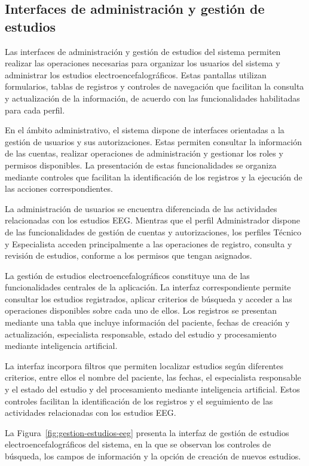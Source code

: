 \subsection{Interfaces de administración y gestión de estudios}

Las interfaces de administración y gestión de estudios del sistema
permiten realizar las operaciones necesarias para organizar los
usuarios del sistema y administrar los estudios
electroencefalográficos. Estas pantallas utilizan formularios,
tablas de registros y controles de navegación que facilitan la
consulta y actualización de la información, de acuerdo con las
funcionalidades habilitadas para cada perfil.

En el ámbito administrativo, el sistema dispone de interfaces
orientadas a la gestión de usuarios y sus autorizaciones. Estas
permiten consultar la información de las cuentas, realizar
operaciones de administración y gestionar los roles y permisos
disponibles. La presentación de estas funcionalidades se organiza
mediante controles que facilitan la identificación de los registros
y la ejecución de las acciones correspondientes.

La administración de usuarios se encuentra diferenciada de las
actividades relacionadas con los estudios EEG. Mientras que el
perfil Administrador dispone de las funcionalidades de gestión de
cuentas y autorizaciones, los perfiles Técnico y Especialista
acceden principalmente a las operaciones de registro, consulta
y revisión de estudios, conforme a los permisos que tengan
asignados.

La gestión de estudios electroencefalográficos constituye una de
las funcionalidades centrales de la aplicación. La interfaz
correspondiente permite consultar los estudios registrados,
aplicar criterios de búsqueda y acceder a las operaciones
disponibles sobre cada uno de ellos. Los registros se presentan
mediante una tabla que incluye información del paciente, fechas
de creación y actualización, especialista responsable, estado
del estudio y procesamiento mediante inteligencia artificial.

La interfaz incorpora filtros que permiten localizar estudios
según diferentes criterios, entre ellos el nombre del paciente,
las fechas, el especialista responsable y el estado del estudio y del procesamiento mediante inteligencia artificial. Estos controles facilitan la identificación de
los registros y el seguimiento de las actividades relacionadas
con los estudios EEG.


La Figura~\ref{fig:gestion-estudios-eeg} presenta la interfaz
de gestión de estudios electroencefalográficos del sistema,
en la que se observan los controles de búsqueda, los campos
de información y la opción de creación de nuevos estudios.


